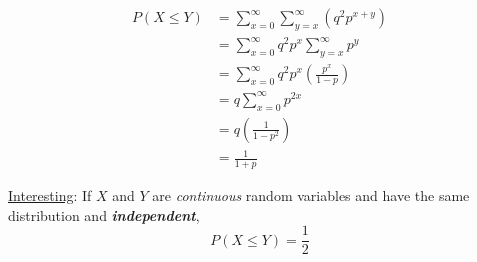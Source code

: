 \begin{Example}{}{}
\begin{enumerate}[label=(\roman*)]
              \begin{align*}
                  P(X\leqslant Y)
                   & =
                  \sum\limits_{x=0}^{\infty}
                  \sum\limits_{y=x}^{\infty}\left( q^2 p^{x+y} \right) \\
                   & =\sum\limits_{x=0}^{\infty} q^2p^x
                  \sum\limits_{y=x}^{\infty} p^y                       \\
                   & =\sum\limits_{x=0}^{\infty}
                  q^2p^x\left( \frac{p^x}{1-p}  \right)                \\
                   & =q\sum\limits_{x=0}^{\infty} p^{2x}               \\
                   & =q\left( \frac{1}{1-p^2}  \right)                 \\
                   & =\frac{1}{1+p}
              \end{align*}

    \end{enumerate}
\end{Example}
\underline{Interesting}:
If $ X $ and $ Y $ are \emph{continuous} random variables
and have the same distribution and \emph{\textbf{independent}},
\[ P(X\leqslant Y)=\frac{1}{2} \]
